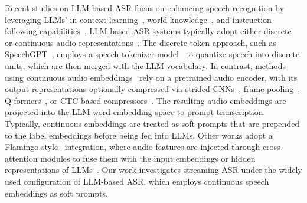 \documentclass{article}
\begin{document}
Recent studies on LLM-based ASR focus on enhancing speech recognition by leveraging LLMs’ in-context learning~\cite{10447553}, world knowledge~\cite{wang-etal-2024-exploring}, and instruction-following capabilities~\cite{instruction-following-speech}.  
LLM-based ASR systems typically adopt either discrete~\cite{zhang-etal-2023-speechgpt, chen2024loss} or continuous audio representations~\cite{10447553, wu2023decoder, fathullah2024prompting, 10446898}.  
The discrete-token approach, such as SpeechGPT~\cite{zhang-etal-2023-speechgpt}, employs a speech tokenizer model~\cite{hsu2021hubert,zhang2024speechtokenizer} to quantize speech into discrete units, which are then merged with the LLM vocabulary.  
In contrast, methods using continuous audio embeddings~\cite{fathullah2024prompting} rely on a pretrained audio encoder, with its output representations optionally compressed via strided CNNs~\cite{fathullah2024prompting}, frame pooling~\cite{ma2024embarrassingly}, Q-formers~\cite{10445874}, or CTC-based compressors~\cite{wu2023decoder}. The resulting audio embeddings are projected into the LLM word embedding space to prompt transcription.  
Typically, continuous embeddings are treated as soft prompts that are prepended to the label embeddings before being fed into LLMs. Other works adopt a Flamingo-style~\cite{alayrac2022flamingo} integration, where audio features are injected through cross-attention modules to fuse them with the input embeddings or hidden representations of LLMs~\cite{10832146, radhakrishnan-etal-2023-whispering}.  
Our work investigates streaming ASR under the widely used configuration of LLM-based ASR, which employs continuous speech embeddings as soft prompts. 
\end{document}
